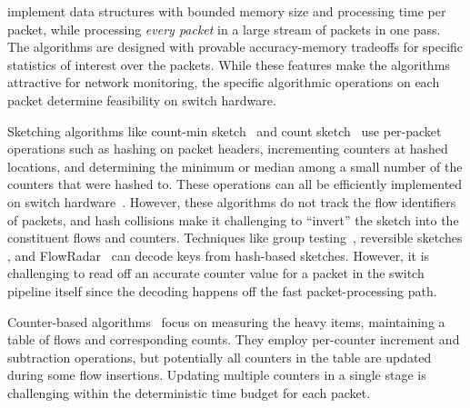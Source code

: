  implement data structures with bounded memory size
and processing time per packet, while processing {\em every packet} in a large
stream of packets in one pass. The algorithms are designed with provable
accuracy-memory tradeoffs for specific statistics of interest over the
packets. While these features make the algorithms attractive for network
monitoring, the specific algorithmic operations on each packet determine
feasibility on switch hardware.

Sketching algorithms like count-min sketch~\cite{cormode2005improved} and count
sketch~\cite{charikar2002finding} use per-packet operations such as hashing on
packet headers, incrementing counters at hashed locations, and determining the
minimum or median among a small number of the counters that were hashed
to. These operations can all be efficiently implemented on switch
hardware~\cite{yu2013software}.
%
However, these algorithms do not track the flow identifiers of packets, and hash
collisions make it challenging to ``invert'' the sketch into the constituent
flows and counters.
%
Techniques like group testing~\cite{group-testing}, reversible sketches
\cite{schweller2004reversible}, and FlowRadar~\cite{li2016flowradar} can decode
keys from hash-based sketches. 
%
However, it is challenging to read off an accurate counter value for a packet in
the switch pipeline itself since the decoding happens off the fast packet-processing
path.
%

Counter-based algorithms~\cite{misra1982finding,manku2002approximate} focus on measuring the heavy
items, maintaining a table of flows and corresponding counts. They employ
per-counter increment and subtraction operations, but potentially all counters
in the table are updated during some flow insertions.
Updating multiple counters in a single stage is challenging within the deterministic time budget for each packet.

